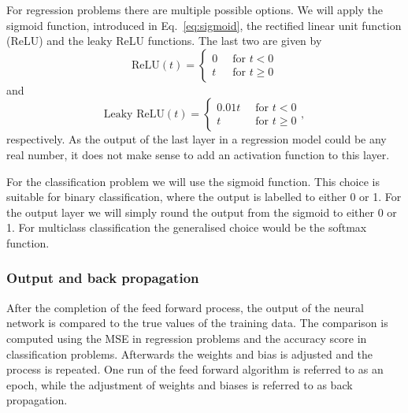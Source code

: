 \documentclass[a4paper,
amsfonts,
amssymb,
amsmath,
reprint,
showkeys,
nofootinbib,
twoside]{revtex4-2}
\begin{document}
For regression problems there are multiple possible options. We will apply the sigmoid function, introduced in Eq.~\eqref{eq:sigmoid}, the rectified linear unit function (ReLU) and the leaky ReLU functions. The last two are given by
\begin{equation}
    \textrm{ReLU}(t) =
    \begin{cases}
        0 \: &\textrm{ for } t < 0 \\
        t \: &\textrm{ for } t \geq 0
    \end{cases}
\end{equation}
and
\begin{equation}
    \textrm{Leaky ReLU}(t) =
    \begin{cases}
        0.01t \: &\textrm{ for } t < 0 \\
        t \: &\textrm{ for } t \geq 0
    \end{cases},
\end{equation}
respectively. As the output of the last layer in a regression model could be any real number, it does not make sense to add an activation function to this layer.

For the classification problem we will use the sigmoid function. This choice is suitable for binary classification, where the output is labelled to either 0 or 1. For the output layer we will simply round the output from the sigmoid to either 0 or 1. For multiclass classification the generalised choice would be the softmax function.

\subsubsection{Output and back propagation}
After the completion of the feed forward process, the output of the neural network is compared to the true values of the training data. The comparison is computed using the MSE in regression problems and the accuracy score in classification problems. Afterwards the weights and bias is adjusted and the process is repeated. One run of the feed forward algorithm is referred to as an epoch, while the adjustment of weights and biases is referred to as back propagation.
\end{document}
